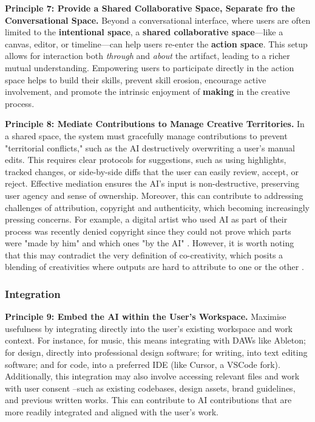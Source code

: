 \textbf{Principle 7: Provide a Shared Collaborative Space, Separate fro the Conversational Space.} Beyond a conversational interface, where users are often limited to the \textbf{intentional space}, a \textbf{shared collaborative space}—like a canvas, editor, or timeline—can help users re-enter the \textbf{action space}. This setup allows for interaction both \textit{through} and \textit{about} the artifact, leading to a richer mutual understanding. Empowering users to participate directly in the action space helps to build their skills, prevent skill erosion, encourage active involvement, and promote the intrinsic enjoyment of \textbf{making} in the creative process. 

\textbf{Principle 8: Mediate Contributions to Manage Creative Territories.} In a shared space, the system must gracefully manage contributions to prevent "territorial conflicts," such as the AI destructively overwriting a user's manual edits. This requires clear protocols for suggestions, such as using highlights, tracked changes, or side-by-side diffs that the user can easily review, accept, or reject. Effective mediation ensures the AI's input is non-destructive, preserving user agency and sense of ownership. Moreover, this can contribute to addressing challenges of attribution, copyright and authenticity, which becoming increasingly pressing concerns. For example, a digital artist who used AI as part of their process was recently denied copyright since they could not prove which parts were "made by him" and which ones "by the AI" \cite{US-Copyright-Office-Review-Board2023-nw}. However, it is worth noting that this may contradict the very definition of co-creativity, which posits a blending of creativities where outputs are hard to attribute to one or the other \cite{Davis2013-jy}. 

\subsubsection{Integration}

\textbf{Principle 9: Embed the AI within the User's Workspace.} Maximise usefulness by integrating directly into the user's existing workspace and work context. For instance, for music, this means integrating with DAWs like Ableton; for design, directly into professional design software; for writing, into text editing software; and for code, into a preferred IDE (like Cursor, a VSCode fork). Additionally, this integration may also involve accessing relevant files and work with user consent --such as existing codebases, design assets, brand guidelines, and previous written works. This can contribute to AI contributions that are more readily integrated and aligned with the user's work. 

